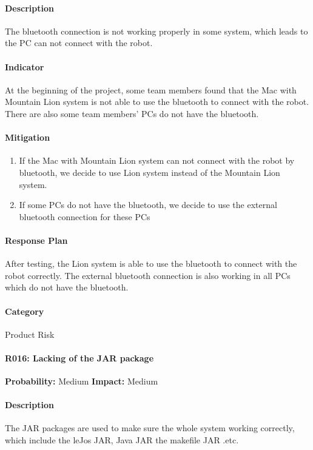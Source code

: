 \documentclass[11pt, a4paper]{report}
\begin{document}
	\paragraph{Description}The bluetooth connection is not working properly in some system, which leads to the PC can not connect with the robot.  
	\paragraph{Indicator}At the beginning of the project, some team members found that the Mac with Mountain Lion system is not able to use the bluetooth to connect with the robot. There are also some team members' PCs do not have the bluetooth. 
	\paragraph{Mitigation}
\begin{enumerate}
\item If the Mac with Mountain Lion system can not connect with the robot by bluetooth, we decide to use Lion system instead of the Mountain Lion system.
\item If some PCs do not have the bluetooth, we decide to use the external bluetooth connection for these PCs
\end{enumerate}	
	\paragraph{Response Plan}After testing, the Lion system is able to use the bluetooth to connect with the robot correctly. The external bluetooth connection is also working in all PCs which do not have the bluetooth. \\
	\paragraph{Category}Product Risk
	
	\paragraph{R016: Lacking of the JAR package} \hspace{1cm} \textbf{Probability: }Medium\hspace{1cm}   \textbf{Impact: }Medium
	\paragraph{Description}The JAR packages are used to make sure the whole system working correctly, which include the leJos JAR, Java JAR the makefile JAR .etc. 
\end{document}
